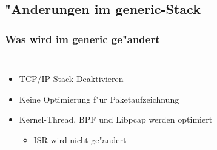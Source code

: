\documentclass{beamer}
\begin{document}
\subsection*{"Anderungen im generic-Stack}
\begin{frame}
\frametitle{Was wird im generic ge"andert}
\begin{columns}
\begin{itemize}
	\item <2->TCP/IP-Stack Deaktivieren\newline
	\item <3->Keine Optimierung f"ur Paketaufzeichnung\newline
	\item <4->Kernel-Thread, BPF und Libpcap werden optimiert\newline
		\begin{itemize}
			\item <4->ISR wird nicht ge"andert
		\end{itemize}
\end{itemize}
\vspace{-2em}

\end{columns}
\end{frame}
\end{document}
